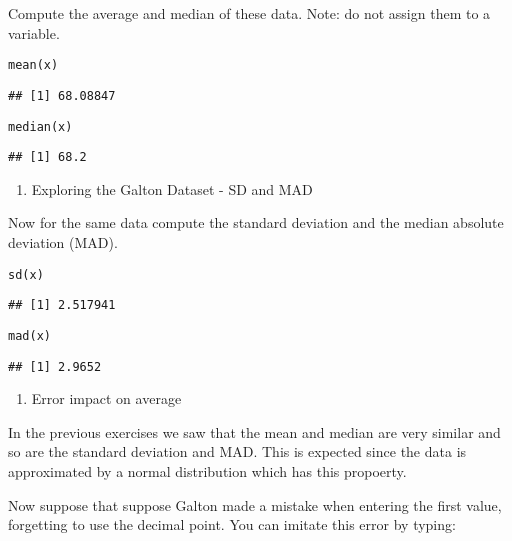 \documentclass[]{article}
\providecommand{\tightlist}{%
  \setlength{\itemsep}{0pt}\setlength{\parskip}{0pt}}
\begin{document}
Compute the average and median of these data. Note: do not assign them
to a variable.

\begin{verbatim}
mean(x)
\end{verbatim}

\begin{verbatim}
## [1] 68.08847
\end{verbatim}

\begin{verbatim}
median(x)
\end{verbatim}

\begin{verbatim}
## [1] 68.2
\end{verbatim}

\begin{enumerate}
\def\labelenumi{\arabic{enumi}.}
\setcounter{enumi}{1}
\tightlist
\item
  Exploring the Galton Dataset - SD and MAD
\end{enumerate}

Now for the same data compute the standard deviation and the median
absolute deviation (MAD).

\begin{verbatim}
sd(x)
\end{verbatim}

\begin{verbatim}
## [1] 2.517941
\end{verbatim}

\begin{verbatim}
mad(x)
\end{verbatim}

\begin{verbatim}
## [1] 2.9652
\end{verbatim}

\begin{enumerate}
\def\labelenumi{\arabic{enumi}.}
\setcounter{enumi}{2}
\tightlist
\item
  Error impact on average
\end{enumerate}

In the previous exercises we saw that the mean and median are very
similar and so are the standard deviation and MAD. This is expected
since the data is approximated by a normal distribution which has this
propoerty.

Now suppose that suppose Galton made a mistake when entering the first
value, forgetting to use the decimal point. You can imitate this error
by typing:
\end{document}
